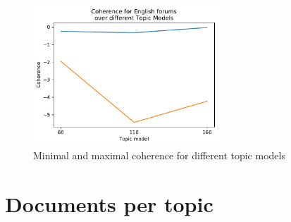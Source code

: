 \begin{figure}[t]
\begin{minipage}{0.5\textwidth}
	\end{minipage}%
	\centering
	\begin{minipage}{0.5\textwidth}
		\includegraphics[width=7cm]{gfx/Eval_IC/English_forums_Coherence.pdf}
	\end{minipage}
	\caption[]{Minimal and maximal coherence for different topic models}
\end{figure}


\section{Documents per topic}

